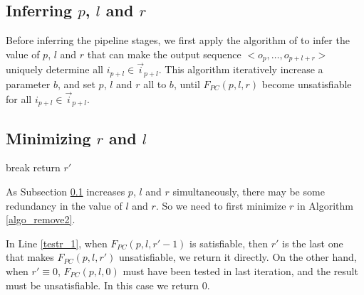 \documentclass[runningheads,a4paper,orivec]{llncs}
\begin{document}
\subsection{Inferring $p$, $l$ and $r$}\label{subsec_inferplr}
Before inferring the pipeline stages,
we first apply the algorithm of \cite{ShenTCAD11} to infer the value of $p$, $l$ and $r$ that can make the 
output sequence $<o_{p},\dots,o_{p+l+r}>$ uniquely determine all $i_{p+l}\in \vec{i}_{p+l}$.
This algorithm iteratively increase a parameter $b$,
and set $p$, $l$ and $r$ all to $b$,
until $F_{PC}(p,l,r)$ become unsatisfiable for all $i_{p+l}\in \vec{i}_{p+l}$.

\subsection{Minimizing $r$ and $l$}\label{reduceing}

\begin{algorithm}[t]
\SetAlgoVlined
{} {
   {
    break
  }
}
return $r'$
\caption{$RemoveRedundancy(p,l,r)$}
\label{algo_remove2}
\end{algorithm}

As Subsection \ref{subsec_inferplr} increases $p$, $l$ and $r$ simultaneously,
there may be some redundancy in the value of $l$ and $r$.
So we need to first minimize $r$ in Algorithm \ref{algo_remove2}.


In Line \ref{testr_1},
when $F_{PC}(p,l,r'-1)$ is satisfiable,
then $r'$ is the last one that makes $F_{PC}(p,l,r')$ unsatisfiable,
we return it directly.
On the other hand,
when $r'\equiv 0$,
$F_{PC}(p,l,0)$ must have been tested in last iteration,
and the result must be unsatisfiable.
In this case we return $0$.
\end{document}
